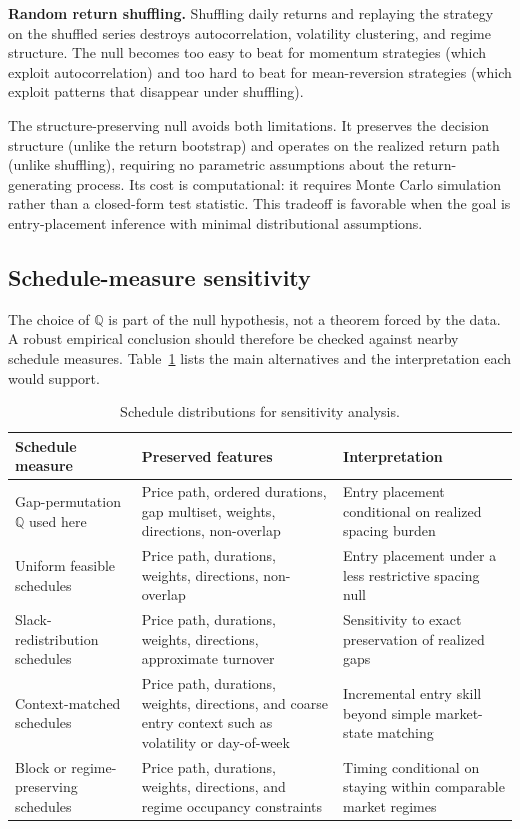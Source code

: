 \documentclass[preprint,12pt]{elsarticle}
\theoremstyle{definition}
\begin{document}
\textbf{Random return shuffling.} Shuffling daily returns and replaying the strategy on the shuffled series destroys autocorrelation, volatility clustering, and regime structure. The null becomes too easy to beat for momentum strategies (which exploit autocorrelation) and too hard to beat for mean-reversion strategies (which exploit patterns that disappear under shuffling).

The structure-preserving null avoids both limitations. It preserves the decision structure (unlike the return bootstrap) and operates on the realized return path (unlike shuffling), requiring no parametric assumptions about the return-generating process. Its cost is computational: it requires Monte Carlo simulation rather than a closed-form test statistic. This tradeoff is favorable when the goal is entry-placement inference with minimal distributional assumptions.

\subsection{Schedule-measure sensitivity}

The choice of $\mathbb{Q}$ is part of the null hypothesis, not a theorem forced by the data. A robust empirical conclusion should therefore be checked against nearby schedule measures. Table~\ref{tab:schedule_measures} lists the main alternatives and the interpretation each would support.

\begin{table}[H]
\centering
\caption{Schedule distributions for sensitivity analysis.}
\label{tab:schedule_measures}
\small
\renewcommand{\arraystretch}{1.12}
\begin{tabular}{@{}>{\raggedright\arraybackslash}p{}>{\raggedright\arraybackslash}p{}>{\raggedright\arraybackslash}p{}@{}}
\toprule
Schedule measure & Preserved features & Interpretation \\
\midrule
Gap-permutation $\mathbb{Q}$ used here & Price path, ordered durations, gap multiset, weights, directions, non-overlap & Entry placement conditional on realized spacing burden \\
Uniform feasible schedules & Price path, durations, weights, directions, non-overlap & Entry placement under a less restrictive spacing null \\
Slack-redistribution schedules & Price path, durations, weights, directions, approximate turnover & Sensitivity to exact preservation of realized gaps \\
Context-matched schedules & Price path, durations, weights, directions, and coarse entry context such as volatility or day-of-week & Incremental entry skill beyond simple market-state matching \\
Block or regime-preserving schedules & Price path, durations, weights, directions, and regime occupancy constraints & Timing conditional on staying within comparable market regimes \\
\bottomrule
\end{tabular}
\end{table}
\end{document}
